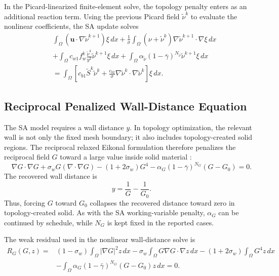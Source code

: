 In the Picard-linearized finite-element solve, the topology penalty enters as an additional reaction term. Using the previous Picard field $\tilde{\nu}^{k}$ to evaluate the nonlinear coefficients, the SA update solves
\begin{equation}
	\begin{aligned}
		&\int_\Omega (\mathbf{u}\cdot\nabla\tilde{\nu}^{k+1})\xi\,dx
		+\frac{1}{\sigma}\int_\Omega(\nu+\tilde{\nu}^{k})
		\nabla\tilde{\nu}^{k+1}\cdot\nabla\xi\,dx \\
		&+\int_\Omega c_{w1}f_w^{k}\frac{\tilde{\nu}^{k}}{y^2}
		\tilde{\nu}^{k+1}\xi\,dx
		+\int_\Omega \alpha_{\tilde{\nu}}(1-\bar{\gamma})^{N_{\tilde{\nu}}}
		\tilde{\nu}^{k+1}\xi\,dx \\
		&=
		\int_\Omega
		\left[
			c_{b1}\tilde{S}^{k}\tilde{\nu}^{k}
			+\frac{c_{b2}}{\sigma}
			\nabla\tilde{\nu}^{k}\cdot\nabla\tilde{\nu}^{k}
		\right]\xi\,dx .
	\end{aligned}
	\label{eq:penalized_sa_weak}
\end{equation}

\subsection{Reciprocal Penalized Wall-Distance Equation}
The SA model requires a wall distance $y$. In topology optimization, the relevant wall is not only the fixed mesh boundary; it also includes topology-created solid regions. The reciprocal relaxed Eikonal formulation therefore penalizes the reciprocal field $G$ toward a large value inside solid material \cite{Yoon2016}:
\begin{equation}
	\nabla G \cdot \nabla G
	+ \sigma_w G(\nabla\cdot\nabla G)
	- (1+2\sigma_w)G^4
	- \alpha_G(1-\bar{\gamma})^{N_G}(G-G_0)
	=0 .
	\label{eq:penalized_eikonal}
\end{equation}
The recovered wall distance is
\begin{equation}
	y = \frac{1}{G} - \frac{1}{G_0}.
	\label{eq:reciprocal_wall_distance_recovery}
\end{equation}
Thus, forcing $G$ toward $G_0$ collapses the recovered distance toward zero in topology-created solid. As with the SA working-variable penalty, $\alpha_G$ can be continued by schedule, while $N_G$ is kept fixed in the reported cases.

The weak residual used in the nonlinear wall-distance solve is
\begin{equation}
	\begin{aligned}
		R_G(G,z)=
		&(1-\sigma_w)\int_\Omega |\nabla G|^2 z\,dx
		-\sigma_w\int_\Omega G\nabla G\cdot\nabla z\,dx
		-(1+2\sigma_w)\int_\Omega G^4z\,dx \\
		&-\int_\Omega \alpha_G(1-\bar{\gamma})^{N_G}(G-G_0)z\,dx
		=0 .
	\end{aligned}
	\label{eq:penalized_eikonal_weak}
\end{equation}


